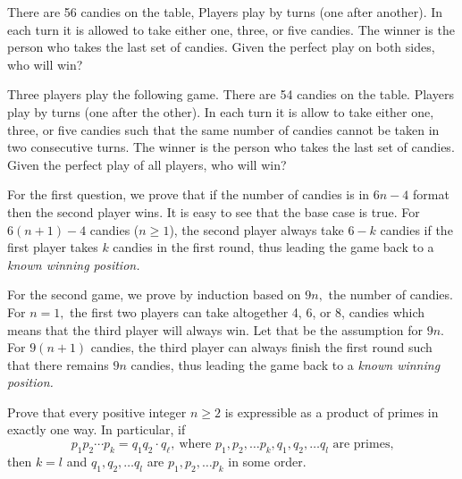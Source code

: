\documentclass{article}
\begin{document}
\begin{problem}
    There are 56 candies on the table, Players play by turns (one after another).
    In each turn it is allowed to take either one, three, or five candies.
    The winner is the person who takes the last set of candies.
    Given the perfect play on both sides, who will win?

    Three players play the following game. There are 54 candies on the table. Players play by turns (one after the other).
    In each turn it is allow to take either one, three, or five candies such that the same number of candies cannot be taken in two consecutive turns.
    The winner is the person who takes the last set of candies.
    Given the perfect play of all players, who will win?
\end{problem}

\begin{soln}
    For the first question, we prove that if the number of candies is in $6n-4$ format then the second player wins.
    It is easy to see that the base case is true.
    For $6(n+1)-4$ candies ($n\ge 1$), the second player always take $6-k$ candies if the first player takes $k$ candies in the first round,
    thus leading the game back to a \textit{known winning position.}

    For the second game, we prove by induction based on $9n,$ the number of candies.
    For $n=1,$ the first two players can take altogether 4, 6, or 8, candies which means that the third player will always win.
    Let that be the assumption for $9n.$ For $9(n+1)$ candies, the third player can always finish the first round such that there remains $9n$ candies,
    thus leading the game back to a \textit{known winning position.}
\end{soln}

\begin{problem}
    Prove that every positive integer $n \ge 2$ is expressible as a product of primes in exactly one way.
    In particular, if 
    \[
        p_1 p_2 \cdots p_k = q_1 q_2 \cdot q_{\ell},\ \text{where } p_1, p_2, \ldots p_k, q_1, q_2, \ldots q_l \text{\ are primes,}
    \]
    then $k = l$ and $q_1, q_2, \ldots q_l$ are $p_1, p_2, \ldots p_k$ in some order.
\end{problem}
\end{document}
